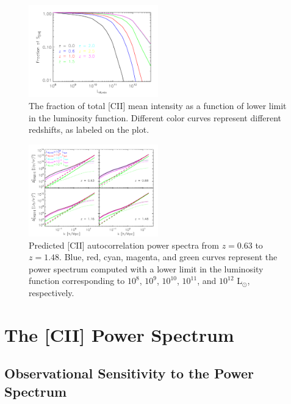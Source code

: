 \documentclass[iop]{emulateapj}
\begin{document}
\begin{figure}
\centering
\includegraphics[width=0.5\textwidth]{fraction_cii_emissivity_vs_LIRmin_vs_z}
\caption{The fraction of total [CII] mean intensity as a function of lower limit in the luminosity function. Different color curves represent different redshifts, as labeled on the plot.}
\label{fig:frac_cii_b11_lirmin}
\end{figure}

\begin{figure}
\centering
\includegraphics[width=0.5\textwidth]{pcii_STARFIRE_z63_z88_z116_z148_lirmin_halofit_bethermin_spinoglio_ap2p5m_1sqdeg_uhp_ktnonzero}
\caption{Predicted [CII] autocorrelation power spectra from $z = 0.63$ to $z = 1.48$. Blue, red, cyan, magenta, and green curves represent the power spectrum computed with a lower limit in the luminosity function corresponding to $10^8$, $10^9$, $10^{10}$, $10^{11}$, and $10^{12}$ L$_{\odot}$, respectively.}
\label{fig:pcii_lirmin}
\end{figure}

\section{The [CII] Power Spectrum}

\subsection{Observational Sensitivity to the Power Spectrum}
\end{document}
